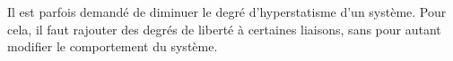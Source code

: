 Il est parfois demandé de diminuer le degré d'hyperstatisme d'un système. Pour cela, il faut rajouter des degrés de liberté à certaines liaisons, sans pour autant modifier le comportement du système.


%
%
%
%
%  
%
%
%
%
%

